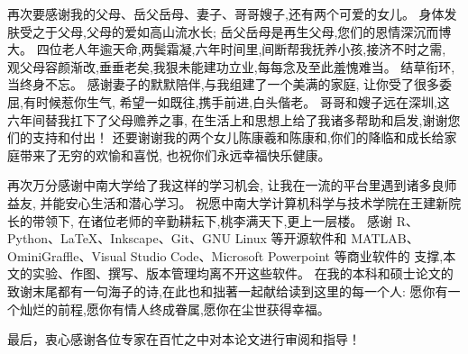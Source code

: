 再次要感谢我的父母、岳父岳母、妻子、哥哥嫂子,还有两个可爱的女儿。
身体发肤受之于父母,父母的爱如高山流水长;
岳父岳母是再生父母,您们的恩情深沉而博大。
四位老人年逾天命,两鬓霜凝,六年时间里,间断帮我抚养小孩,接济不时之需,
观父母容颜渐改,垂垂老矣,我狠未能建功立业,每每念及至此羞愧难当。
结草衔环,当终身不忘。
感谢妻子的默默陪伴,与我组建了一个美满的家庭,
让你受了很多委屈,有时候惹你生气,
希望一如既往,携手前进,白头偕老。
哥哥和嫂子远在深圳,这六年间替我扛下了父母赡养之事,
在生活上和思想上给了我诸多帮助和启发,谢谢您们的支持和付出！
还要谢谢我的两个女儿陈康羲和陈康和,你们的降临和成长给家庭带来了无穷的欢愉和喜悦,
也祝你们永远幸福快乐健康。

再次万分感谢中南大学给了我这样的学习机会, 
让我在一流的平台里遇到诸多良师益友,
并能安心生活和潜心学习。
祝愿中南大学计算机科学与技术学院在王建新院长的带领下, 
在诸位老师的辛勤耕耘下,桃李满天下,更上一层楼。
感谢 R、Python、\LaTeX、Inkscape、Git、GNU Linux 等开源软件和 MATLAB、OminiGraffle、Visual Studio Code、Microsoft Powerpoint 等商业软件的
支撑,本文的实验、作图、撰写、版本管理均离不开这些软件。
在我的本科和硕士论文的致谢末尾都有一句海子的诗,在此也和拙著一起献给读到这里的每一个人:
愿你有一个灿烂的前程,愿你有情人终成眷属,愿你在尘世获得幸福。

最后，衷心感谢各位专家在百忙之中对本论文进行审阅和指导！